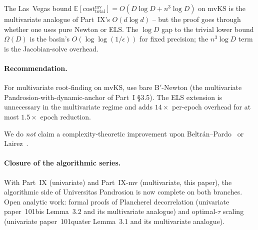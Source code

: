 \documentclass[11pt,a4paper]{article}
\begin{document}
The Las~Vegas bound $\mathbb{E}[\mathrm{cost}_{\text{total}}^{\text{mv}}] = O(D \log D + n^3 \log D)$ on mvKS is the multivariate analogue of Part~IX's $O(d \log d)$ -- but the proof goes through whether one uses pure Newton or ELS. The $\log D$ gap to the trivial lower bound $\Omega(D)$ is the basin's $O(\log\log(1/\epsilon))$ for fixed precision; the $n^3 \log D$ term is the Jacobian-solve overhead.

\paragraph{Recommendation.} For multivariate root-finding on mvKS, use bare B$'$-Newton (the multivariate Pandrosion-with-dynamic-anchor of Part~I §3.5). The ELS extension is unnecessary in the multivariate regime and adds $14\times$ per-epoch overhead for at most $1.5\times$ epoch reduction.

We do \emph{not} claim a complexity-theoretic improvement upon Beltr\'an--Pardo~\cite{beltranpardo} or Lairez~\cite{lairez}.

\paragraph{Closure of the algorithmic series.} With Part~IX (univariate) and Part~IX-mv (multivariate, this paper), the algorithmic side of Universitas Pandrosion is now complete on both branches. Open analytic work: formal proofs of Plancherel decorrelation (univariate paper~101bis Lemma~3.2 and its multivariate analogue) and optimal-$\tau$ scaling (univariate paper~101quater Lemma~3.1 and its multivariate analogue).
\end{document}
